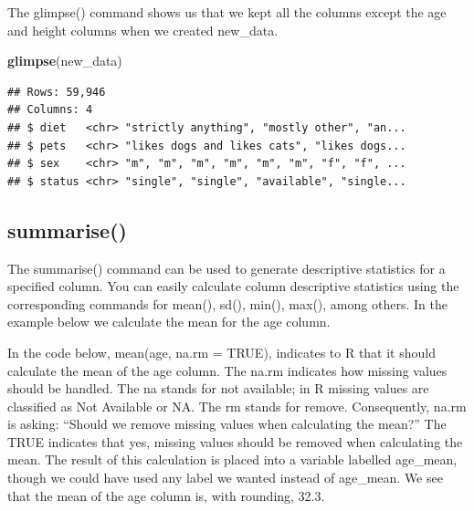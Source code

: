 \documentclass[
]{krantz}
\makeatletter
\newenvironment{Shaded}{\begin{snugshade}}{\end{snugshade}}
\newcommand{\DataTypeTok}[1]{\textcolor[rgb]{0.27,0.27,0.27}{#1}}
\newcommand{\KeywordTok}[1]{\textcolor[rgb]{0.27,0.27,0.27}{\textbf{#1}}}
\newcommand{\NormalTok}[1]{#1}
\newcommand{\OperatorTok}[1]{\textcolor[rgb]{0.43,0.43,0.43}{\textbf{#1}}}
\newcommand{\OtherTok}[1]{\textcolor[rgb]{0.37,0.37,0.37}{#1}}
\newcommand{\StringTok}[1]{\textcolor[rgb]{0.5,0.5,0.5}{#1}}
\newenvironment{kframe}{%
\medskip{}
\setlength{\fboxsep}{.8em}
 \def\at@end@of@kframe{}%
 \ifinner\ifhmode%
  \def\at@end@of@kframe{\end{minipage}}%
  \begin{minipage}{\columnwidth}%
 \fi\fi%
 \def\FrameCommand##1{\hskip\@totalleftmargin \hskip-\fboxsep
 \colorbox{shadecolor}{##1}\hskip-\fboxsep
     \hskip-\linewidth \hskip-\@totalleftmargin \hskip\columnwidth}%
 \MakeFramed {\advance\hsize-\width
   \@totalleftmargin\z@ \linewidth\hsize
   \@setminipage}}%
 {\par\unskip\endMakeFramed%
 \at@end@of@kframe}
\renewenvironment{Shaded}{\begin{kframe}}{\end{kframe}}
\makeatother
\begin{document}
The glimpse() command shows us that we kept all the columns except the age and height columns when we created new\_data.

\begin{Shaded}
\begin{Highlighting}[]
\KeywordTok{glimpse}\NormalTok{(new_data)}
\end{Highlighting}
\end{Shaded}

\begin{verbatim}
## Rows: 59,946
## Columns: 4
## $ diet   <chr> "strictly anything", "mostly other", "an...
## $ pets   <chr> "likes dogs and likes cats", "likes dogs...
## $ sex    <chr> "m", "m", "m", "m", "m", "m", "f", "f", ...
## $ status <chr> "single", "single", "available", "single...
\end{verbatim}

\hypertarget{summarise}{%
\subsection{summarise()}\label{summarise}}

The summarise() command can be used to generate descriptive statistics for a specified column. You can easily calculate column descriptive statistics using the corresponding commands for mean(), sd(), min(), max(), among others. In the example below we calculate the mean for the age column.

In the code below, mean(age, na.rm = TRUE), indicates to R that it should calculate the mean of the age column. The na.rm indicates how missing values should be handled. The na stands for not available; in R missing values are classified as Not Available or NA. The rm stands for remove. Consequently, na.rm is asking: ``Should we remove missing values when calculating the mean?'' The TRUE indicates that yes, missing values should be removed when calculating the mean. The result of this calculation is placed into a variable labelled age\_mean, though we could have used any label we wanted instead of age\_mean. We see that the mean of the age column is, with rounding, 32.3.

\begin{Shaded}
\end{Shaded}
\end{document}
